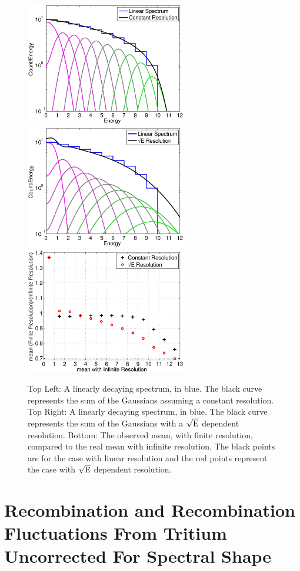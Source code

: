  \begin{figure}[h!]\centering
\includegraphics[width=70mm]{Recombination_LY_QY/Figures/Toy_Model_lin_const}
\includegraphics[width=70mm]{Recombination_LY_QY/Figures/Toy_Model_lin_dep}
\includegraphics[width=70mm]{Recombination_LY_QY/Figures/Toy_Model_mean_shift}
\caption{Top Left: A linearly decaying spectrum, in blue. The black curve represents the sum of the Gaussians assuming a constant resolution. Top Right: A linearly decaying spectrum, in blue. The black curve represents the sum of the Gaussians with a $\rm \sqrt{E}$ dependent resolution. Bottom: The observed mean, with finite resolution, compared to the real mean with infinite resolution. The black points are for the case with linear resolution and the red points represent the case with $\rm \sqrt{E}$ dependent resolution.}
\label{fig:Toy_Linear}
\end{figure}


\section{Recombination and Recombination Fluctuations From Tritium Uncorrected For Spectral Shape}

